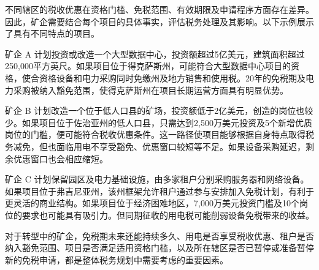 不同辖区的税收优惠在资格门槛、免税范围、有效期限及申请程序方面存在差异。因此，矿企需要结合每个项目的具体事实，评估税务处理及其影响。以下示例展示了具有不同特点的项目。

矿企 A 计划投资或改造一个大型数据中心，投资额超过5亿美元，建筑面积超过250,000平方英尺。如果项目位于得克萨斯州，可能符合大型数据中心项目的资格，使合资格设备和电力采购同时免缴州及地方销售和使用税。20年的免税期及电力采购被纳入豁免范围，使得克萨斯州在项目长期运营方面具有明显优势。

矿企 B 计划改造一个位于低人口县的矿场，投资额低于2亿美元，创造的岗位也较少。如果项目位于佐治亚州的低人口县，只需达到2,500万美元投资及5个新增优质岗位的门槛，便可能符合税收优惠条件。这一路径使项目能够根据自身特点取得税务减免，但也面临用电不享受豁免、优惠窗口较短等不足。如果设备采购延迟，剩余优惠窗口也会相应缩短。

矿企 C 计划保留园区及电力基础设施，由多家租户分别采购服务器和网络设备。如果项目位于弗吉尼亚州，该州框架允许租户通过参与安排加入免税计划，有利于更灵活的商业结构。如果项目位于经济困难地区，7,000万美元投资门槛及10个岗位的要求也可能具有吸引力。但同期征收的用电税可能削弱设备免税带来的收益。

对于转型中的矿企，免税期未来还能持续多久、用电是否享受税收优惠、租户是否纳入豁免范围、项目是否满足适用资格门槛，以及所在辖区是否已暂停或准备暂停新的免税申请，都是整体税务规划中需要考虑的重要因素。

\FloatBarrier
